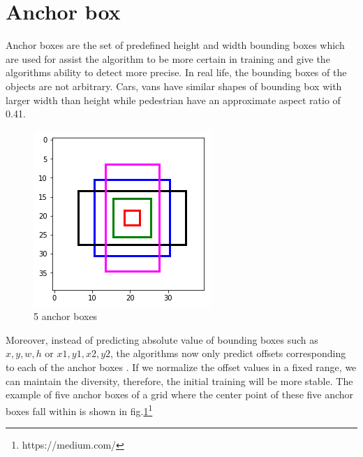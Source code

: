 \section{Anchor box}
\hspace{0.45cm}Anchor boxes are the set of predefined height and width bounding boxes which are used for assist the algorithm to be more certain in training and give the algorithms ability to detect more precise.
In real life, the bounding boxes of the objects are not arbitrary. Cars, vans have similar shapes of bounding box with larger width than height while pedestrian have an approximate aspect ratio of 0.41.
\begin{figure}[h!]
    \centering
    \includegraphics[scale=0.5]{Chapters/Fig/anchor_boxes.png}
    \caption{5 anchor boxes}
    \label{fig:ab}
\end{figure}\par
Moreover, instead of predicting absolute value of bounding boxes such as $x,y,w,h$ or $x1,y1,x2,y2$, the algorithms now only predict offsets corresponding to each of the anchor boxes . If we normalize the offset values in a fixed range, we can maintain the diversity, therefore, the initial training will be more stable.
The example of five anchor boxes of a grid where the center point of these five anchor boxes fall within is shown in fig.\ref{fig:ab}\footnote{https://medium.com/}